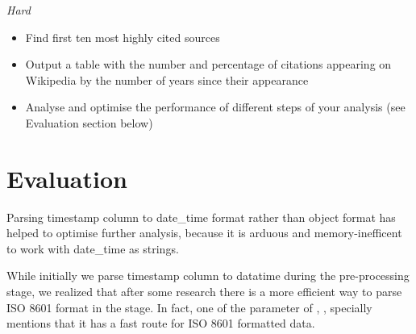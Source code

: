 \documentclass[12pt,a4paper,final]{article}
\begin{document}
\begin{center} \emph{Hard} \end{center}
\begin{itemize}[noitemsep]
    \item Find first ten most highly cited sources
    \item Output a table with the number and percentage of citations appearing on Wikipedia by the number of years since their appearance
    \item Analyse and optimise the performance of different steps of your analysis (see Evaluation section below)
\end{itemize}

\section*{Evaluation}
Parsing timestamp column to date_time format rather than object format has helped to optimise further analysis, because it is arduous and memory-inefficent to work with date_time as strings.

While initially we parse timestamp column to datatime during the pre-processing stage, we realized that after some research there is a more efficient way to parse ISO 8601 format in the  stage.
In fact, one of the parameter of , , specially mentions that it has a fast route for ISO 8601 formatted data.
\end{document}

